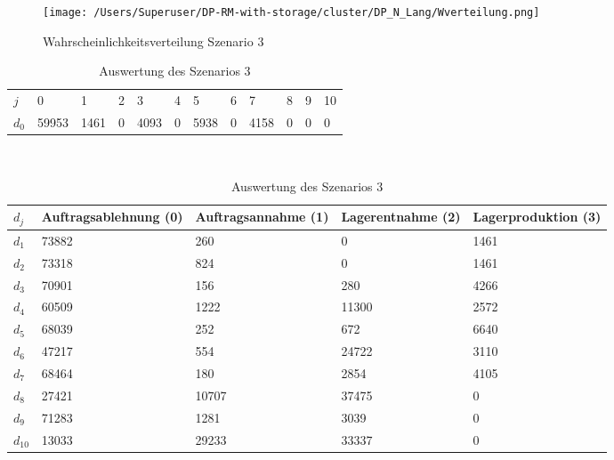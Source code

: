 \begin{figure}[h!]
  \begin{center}
    \texttt{[image: /Users/Superuser/DP-RM-with-storage/cluster/DP\_N\_Lang/Wverteilung.png]}
    \caption{Wahrscheinlichkeitsverteilung Szenario 3}  \label{SB3}
  \end{center}
\end{figure}

\begin{table}[h!]
\renewcommand{\arraystretch}{1.5}
  \begin{center}
    \caption{Auswertung des Szenarios 3}  \label{AS3}
    \vspace*{3mm}
    \begin{tabular}{l l l l l l l l l l l l }  \hline 
         $j$ & 0 & 1  & 2 & 3 & 4  & 5 & 6 & 7 & 8 & 9 & 10  \\  
$d_{0}$ &  59953 &  1461 &  0 &  4093 &  0 &  5938 &  0 &  4158 &  0 &  0 &  0 \\\hline
    \end{tabular} \\[3mm]
        \begin{tabular}{ l p{2.5cm} p{2.5cm} p{2.5cm} p{2.5cm} }   \hline    %
    $d_j$ & Auftrags\-ablehnung (0) & Auftrags\-annahme (1)  & Lager\-entnahme (2) & Lager\-produktion (3)\\\hline 
$d_{1}$  &  73882 &    260 &    0 &  1461 \\
$d_{2}$  &  73318 &    824 &    0 &  1461 \\
$d_{3}$  &  70901 &    156 &    280 &  4266 \\
$d_{4}$  &  60509 &   1222 &  11300 &  2572 \\
$d_{5}$  &  68039 &    252 &    672 &  6640 \\
$d_{6}$  &  47217 &    554 &  24722 &  3110 \\
$d_{7}$  &  68464 &    180 &   2854 &  4105 \\
$d_{8}$  &  27421 &  10707 &  37475 &   0 \\
$d_{9}$  &  71283 &   1281 &   3039 &   0 \\
$d_{10}$ &  13033 &  29233 &  33337 &   0 \\
          \hline
   \end{tabular} \\[3mm]
     \end{center}
\end{table}


